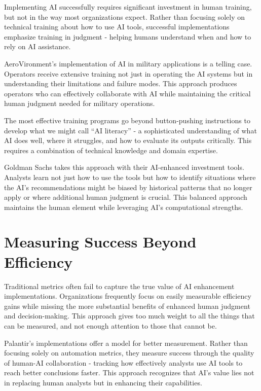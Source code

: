 \documentclass[
  Letterpaper,
]{scrbook}
\begin{document}
Implementing AI successfully requires significant investment in human
training, but not in the way most organizations expect. Rather than
focusing solely on technical training about how to use AI tools,
successful implementations emphasize training in judgment - helping
humans understand when and how to rely on AI assistance.

AeroVironment's implementation of AI in military applications is a
telling case. Operators receive extensive training not just in operating
the AI systems but in understanding their limitations and failure modes.
This approach produces operators who can effectively collaborate with AI
while maintaining the critical human judgment needed for military
operations.

The most effective training programs go beyond button-pushing
instructions to develop what we might call ``AI literacy'' - a
sophisticated understanding of what AI does well, where it struggles,
and how to evaluate its outputs critically. This requires a combination
of technical knowledge and domain expertise.

Goldman Sachs takes this approach with their AI-enhanced investment
tools. Analysts learn not just how to use the tools but how to identify
situations where the AI's recommendations might be biased by historical
patterns that no longer apply or where additional human judgment is
crucial. This balanced approach maintains the human element while
leveraging AI's computational strengths.

\section{Measuring Success Beyond
Efficiency}\label{measuring-success-beyond-efficiency}

Traditional metrics often fail to capture the true value of AI
enhancement implementations. Organizations frequently focus on easily
measurable efficiency gains while missing the more substantial benefits
of enhanced human judgment and decision-making. This approach gives too
much weight to all the things that can be measured, and not enough
attention to those that cannot be.

Palantir's implementations offer a model for better measurement. Rather
than focusing solely on automation metrics, they measure success through
the quality of human-AI collaboration - tracking how effectively
analysts use AI tools to reach better conclusions faster. This approach
recognizes that AI's value lies not in replacing human analysts but in
enhancing their capabilities.
\end{document}
